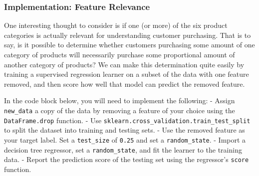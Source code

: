 \documentclass{article}
\begin{document}
    \subsubsection{Implementation: Feature
Relevance}\label{implementation-feature-relevance}

One interesting thought to consider is if one (or more) of the six
product categories is actually relevant for understanding customer
purchasing. That is to say, is it possible to determine whether
customers purchasing some amount of one category of products will
necessarily purchase some proportional amount of another category of
products? We can make this determination quite easily by training a
supervised regression learner on a subset of the data with one feature
removed, and then score how well that model can predict the removed
feature.

In the code block below, you will need to implement the following: -
Assign \texttt{new\_data} a copy of the data by removing a feature of
your choice using the \texttt{DataFrame.drop} function. - Use
\texttt{sklearn.cross\_validation.train\_test\_split} to split the
dataset into training and testing sets. - Use the removed feature as
your target label. Set a \texttt{test\_size} of \texttt{0.25} and set a
\texttt{random\_state}. - Import a decision tree regressor, set a
\texttt{random\_state}, and fit the learner to the training data. -
Report the prediction score of the testing set using the regressor's
\texttt{score} function.
\end{document}
